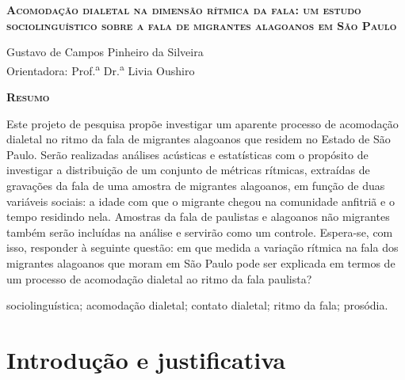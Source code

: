\documentclass[
	a4paper,	%
	12pt,		%
	]{article}	%
\begin{document}
		
{ %

	\begin{center} 
		{\bfseries\Large\scshape 
		Acomodação dialetal na dimensão rítmica da fala: um estudo
		sociolinguístico sobre a fala de migrantes alagoanos em São Paulo 
		} 

	\end{center} 

}
	
\vspace{0.35em}

{ %

\begin{flushright} 
	Gustavo de Campos Pinheiro da Silveira \\ 
	\vspace{5pt}
	Orientadora: Prof.\textsuperscript{a} Dr.\textsuperscript{a} Livia Oushiro
\end{flushright}

\begin{center} 
	{\bfseries\scshape Resumo} \\ 
\end{center}

Este projeto de pesquisa propõe investigar um aparente processo de acomodação
dialetal no ritmo da fala de migrantes alagoanos que residem no Estado de São
Paulo. Serão realizadas análises acústicas e estatísticas com o propósito de
investigar a distribuição de um conjunto de métricas rítmicas, extraídas de
gravações da fala de uma amostra de migrantes alagoanos, em função de duas
variáveis sociais: a idade com que o migrante chegou na comunidade anfitriã e o
tempo residindo nela. Amostras da fala de paulistas e alagoanos não migrantes
também serão incluídas na análise e servirão como um controle. Espera-se, com
isso, responder à seguinte questão: em que medida a variação rítmica na fala dos
migrantes alagoanos que moram em São Paulo pode ser explicada em termos de um
processo de acomodação dialetal ao ritmo da fala paulista?

\par
\vspace{1.35em}

 sociolinguística; acomodação dialetal;
contato dialetal; ritmo da fala; prosódia.

}

\section{Introdução e justificativa}
\label{intro}
\end{document}
